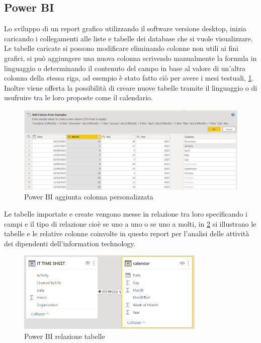 \subsection{Power BI}
Lo sviluppo di un report grafico utilizzando il software  versione desktop, inizia caricando i collegamenti alle liste e tabelle dei database che si vuole visualizzare.
Le tabelle caricate si possono modificare eliminando colonne non utili ai fini grafici, si può aggiungere una nuova colonna scrivendo manualmente la formula in linguaggio  o determinando il contenuto del campo in base al valore di un'altra colonna della stessa riga, ad esempio è stato fatto ciò per avere i mesi testuali, \figurename \space \ref*{fig:IT-PowerBImonth}.\\
Inoltre viene offerta la possibilità di creare nuove tabelle tramite il linguaggio  o di usufruire tra le loro proposte come il calendario.
\begin{figure}[H]
  \centering\includegraphics[width=1\textwidth, height=1\textheight,keepaspectratio]{immagini/IT-PowerBI_MonthText.png}
  \caption{Power BI aggiunta colonna personalizzata}
  \label{fig:IT-PowerBImonth}
\end{figure}
Le tabelle importate e create vengono messe in relazione tra loro specificando i campi e il tipo di relazione cioè se uno a uno o se uno a molti, in \figurename \space \ref*{fig:IT-PowerBIrelazione} si illustrano le tabelle e le relative colonne coinvolte in questo report per l'analisi delle attività dei dipendenti dell'information technology.\\
\begin{figure}[H]
  \centering\includegraphics[width=0.8\textwidth, height=0.8\textheight,keepaspectratio]{immagini/IT-PowerBI_relazione.png}
  \caption{Power BI relazione tabelle}
  \label{fig:IT-PowerBIrelazione}
\end{figure}
